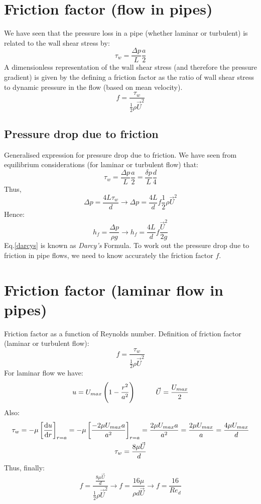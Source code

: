 \section{Friction factor (flow in pipes)}
We have seen that the pressure loss in a pipe (whether laminar or turbulent) is related to the wall shear stress by:
\begin{equation}
  \tau_w = \frac{\Delta p}{L}\frac{a}{2}
\end{equation}
A dimensionless representation of the wall shear stress (and therefore the pressure gradient) is given by the defining a friction factor as the ratio of wall shear stress to dynamic pressure in the flow (based on mean velocity).
\begin{equation}
  f = \frac{\tau_w}{\frac{1}{2}\rho \vec{U}^2}
\end{equation}
\subsection{Pressure drop due to friction}
Generalised expression for pressure drop due to friction. We have seen from equilibrium considerations (for laminar or turbulent flow) that:
\begin{equation}
  \tau_w = \frac{\Delta p}{L} \frac{a}{2} = \frac{\delta p}{L} \frac{d}{4}
\end{equation}
Thus,
\begin{equation}
  \Delta p = \frac{4L\tau_w}{d}\rightarrow \Delta p =\frac{4L}{d} f \frac{1}{2} \rho \vec{U}^2
\end{equation}
Hence:
\begin{equation}
  h_f = \frac{\Delta p}{\rho g} \rightarrow h_f = \frac{4L}{d} f \frac{\vec{U}^2}{2g} \label{darcys}
\end{equation}
Eq.\ref{darcys} is known as \textit{Darcy's} Formula. To work out the pressure drop due to friction in pipe flows, we need to know accurately the friction factor $f$.
\section{Friction factor (laminar flow in pipes)}
Friction factor as a function of Reynolds number. Definition of friction factor (laminar or turbulent flow):
\begin{equation}
  f = \frac{\tau_w}{\frac{1}{2}\rho \vec{U}^2}
\end{equation}
For laminar flow we have:
\begin{equation}
  u = U_{max} \left(1-\frac{r^2}{a^2}\right) \makebox[1cm]{} \vec{U} = \frac{U_{max}}{2}
\end{equation}
Also:
\begin{gather}
  \tau_w = - \mu \left[\frac{\dif u}{\dif r}\right]_{r=a} = -\mu \left[\frac{-2\mu U_{max}a}{a^2}\right]_{r=a} = \frac{2\mu U_{max} a}{a^2} = \frac{2\mu U_{max}}{a} = \frac{4\mu U_{max}}{d}\\
  \tau_w = \frac{8\mu\vec{U}}{d}
\end{gather}
Thus, finally:
\begin{equation}
  f= \frac{\frac{8\mu\vec{U}}{d}}{\frac{1}{2}\rho \vec{U}^2} \rightarrow f = \frac{16\mu}{\rho d \vec{U}} \rightarrow f = \frac{16}{Re_d}
\end{equation}
